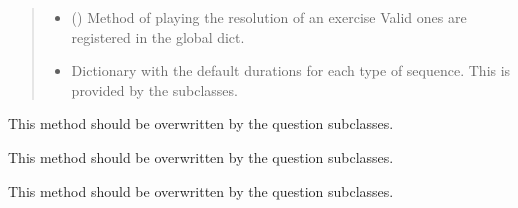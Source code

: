 \documentclass[letterpaper,10pt,english]{sphinxmanual}
\begin{document}
\begin{fulllineitems}
\begin{fulllineitems}
\begin{quote}
\begin{description}
\begin{itemize}
\item {} 
\sphinxAtStartPar
{} () \textendash{} Method of playing the resolution of an
exercise Valid ones are registered in the
 global dict.

\item {} 
\sphinxAtStartPar
{} \textendash{} Dictionary with the default durations for
each type of sequence. This is provided by the subclasses.

\end{itemize}

\end{description}\end{quote}

\end{fulllineitems}


\begin{fulllineitems}
\label{\detokenize{index:birdears.questionbase.QuestionBase.check_question}}
\sphinxAtStartPar
This method should be overwritten by the question subclasses.

\end{fulllineitems}


\begin{fulllineitems}
\label{\detokenize{index:birdears.questionbase.QuestionBase.make_question}}
\sphinxAtStartPar
This method should be overwritten by the question subclasses.

\end{fulllineitems}


\begin{fulllineitems}
\label{\detokenize{index:birdears.questionbase.QuestionBase.make_resolution}}
\sphinxAtStartPar
This method should be overwritten by the question subclasses.


\end{fulllineitems}
\end{fulllineitems}
\end{document}
